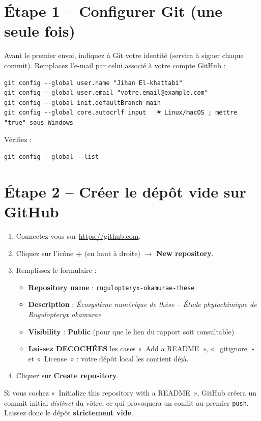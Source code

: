 \documentclass[11pt,a4paper]{article}
\begin{document}
\section{Étape 1 -- Configurer Git (une seule fois)}
Avant le premier envoi, indiquez à Git votre identité (servira à signer chaque commit).
Remplacez l'e-mail par celui associé à votre compte GitHub :

\begin{lstlisting}
git config --global user.name "Jihan El-khattabi"
git config --global user.email "votre.email@example.com"
git config --global init.defaultBranch main
git config --global core.autocrlf input   # Linux/macOS ; mettre "true" sous Windows
\end{lstlisting}

Vérifiez :
\begin{lstlisting}
git config --global --list
\end{lstlisting}

\section{Étape 2 -- Créer le dépôt vide sur GitHub}
\begin{enumerate}
  \item Connectez-vous sur \url{https://github.com}.
  \item Cliquez sur l'icône \textbf{+} (en haut à droite) $\rightarrow$ \textbf{New repository}.
  \item Remplissez le formulaire :
        \begin{itemize}
          \item \textbf{Repository name} : \texttt{rugulopteryx-okamurae-these}
          \item \textbf{Description} : \textit{Écosystème numérique de thèse -- Étude phytochimique de Rugulopteryx okamurae}
          \item \textbf{Visibility} : \textbf{Public} (pour que le lien du rapport soit consultable)
          \item \textbf{Laissez DECOCHÉES} les cases «~Add a README~», «~.gitignore~» et
                «~License~» : votre dépôt local les contient déjà.
        \end{itemize}
  \item Cliquez sur \textbf{Create repository}.
\end{enumerate}

\begin{attention}
Si vous cochez «~Initialize this repository with a README~», GitHub créera un commit
initial \emph{distinct} du vôtre, ce qui provoquera un conflit au premier \texttt{push}.
Laissez donc le dépôt \textbf{strictement vide}.
\end{attention}
\end{document}
